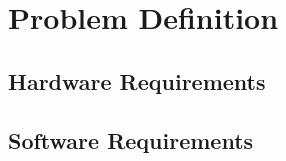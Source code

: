 \section{Problem Definition}
  \subsection{Hardware Requirements}
  \subsection{Software Requirements}